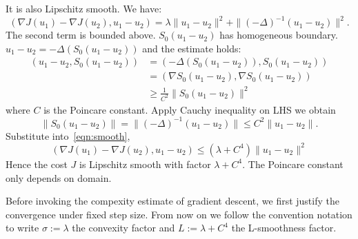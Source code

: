 \documentclass{article}
\begin{document}
It is also Lipschitz smooth. We have:
\begin{equation}\label{eqn:smooth}
(\nabla J(u_1)-\nabla J(u_2),u_1-u_2)=\lambda \|u_1-u_2\|^2 + \|{(-\Delta)}^{-1}(u_1-u_2)\|^2.
\end{equation}
The second term is bounded above. $S_0(u_1-u_2)$ has homogeneous boundary. $u_1-u_2=-\Delta (S_0(u_1-u_2))$ and the estimate holds:
\begin{align*}
    (u_1-u_2,S_0(u_1-u_2)) &= (-\Delta (S_0(u_1-u_2)),S_0(u_1-u_2)) \\
    &=(\nabla S_0(u_1-u_2),\nabla S_0(u_1-u_2)) \\
    &\geq \frac{1}{C^2}\|S_0(u_1-u_2)\|^2
\end{align*}
where $C$ is the Poincare constant. Apply Cauchy inequality on LHS we obtain 
\[
    \|S_0(u_1-u_2)\|=\|{(-\Delta)}^{-1}(u_1-u_2)\|\leq C^2\|u_1-u_2\|.
\]
Substitute into~\ref{eqn:smooth},
\[
    (\nabla J(u_1)-\nabla J(u_2),u_1-u_2)\leq (\lambda +C^4)\|u_1-u_2\|^2
\]
Hence the cost $J$ is Lipschitz smooth with factor $\lambda+C^4$. The Poincare constant only depends on domain. 

Before invoking the compexity estimate of gradient descent, we first justify the convergence under fixed step size. From now on we follow the convention notation to write $\sigma:=\lambda$ the convexity factor and $L:=\lambda+C^4$ the L-smoothness factor.
\end{document}
